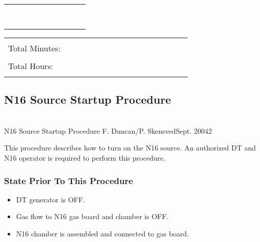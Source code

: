 \begin{center}
\begin{tabular}{|c|c|c|c|c|c|c|c|c|c|}
\hline
  &  &  &  & & & & & &\\
\hline
  &  &  &  & & & & & &\\
\hline
  &  &  &  & & & & & &\\
\hline
  &  &  &  & & & & & &\\
\hline
  &  &  &  & & & & & &\\
\hline
  &  &  &  & & & & & &\\
\hline
  &  &  &  & & & & & &\\
\hline
  &  &  &  & & & & & &\\
\hline
  &  &  &  & & & & & &\\
\hline
\end{tabular}
\end{center}

\noindent
\begin{tabular}{|l|}
\hline
      \\
Total Minutes:~~~~~~~~~~~~~~~~~~~~~~~~\\
      \\
Total Hours:~~~~~~~~~~~~~~~~~~~~~~~~~~~~~~~~\\
      \\
\hline
\end{tabular}



\newpage
\subsection{N16 Source Startup Procedure}
~\\

          {N16 Source Startup Procedure}
          {F. Duncan/P. Skensved}{Sept. 2004}{2}

 
  This procedure describes how to turn on the N16 source.
An authorized DT and N16 operator is required to perform this 
procedure.
  
\subsubsection{State Prior To This Procedure}
\begin{itemize}
\item DT generator is OFF.
\item Gas flow to N16 gas board and chamber is OFF.
\item N16 chamber is assembled and connected to gas board.
\end{itemize}

